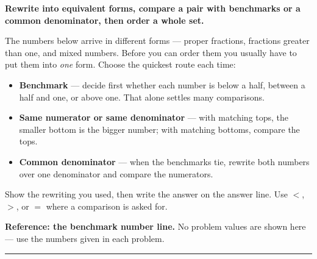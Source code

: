 \documentclass[12pt]{article}
\begin{document}

\noindent\textbf{Rewrite into equivalent forms, compare a pair with benchmarks
or a common denominator, then order a whole set.}

\smallskip
\noindent\small The numbers below arrive in different forms --- proper
fractions, fractions greater than one, and mixed numbers. Before you can order
them you usually have to put them into \emph{one} form. Choose the quickest
route each time:
\begin{itemize}[leftmargin=1.1cm, itemsep=1pt, topsep=2pt]
  \item \textbf{Benchmark} --- decide first whether each number is below a
        half, between a half and one, or above one. That alone settles many
        comparisons.
  \item \textbf{Same numerator or same denominator} --- with matching tops,
        the smaller bottom is the bigger number; with matching bottoms, compare
        the tops.
  \item \textbf{Common denominator} --- when the benchmarks tie, rewrite both
        numbers over one denominator and compare the numerators.
\end{itemize}
Show the rewriting you used, then write the answer on the answer line. Use
$<$, $>$, or $=$ where a comparison is asked for.\normalsize

\smallskip
\noindent\textbf{Reference: the benchmark number line.} No problem values are
shown here --- use the numbers given in each problem.
\begin{center}
\end{center}

\noindent\rule{\linewidth}{0.4pt}


\end{document}
